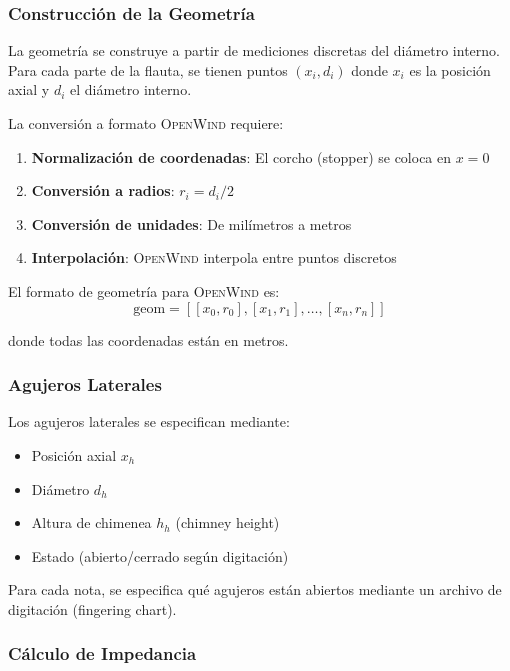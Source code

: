 \documentclass[12pt,a4paper,twocolumn]{article}
\newcommand{\openwind}{\textsc{OpenWind}}
\begin{document}
\subsubsection{Construcción de la Geometría}

La geometría se construye a partir de mediciones discretas del diámetro interno. Para cada parte de la flauta, se tienen puntos $(x_i, d_i)$ donde $x_i$ es la posición axial y $d_i$ el diámetro interno.

La conversión a formato \openwind{} requiere:
\begin{enumerate}
    \item \textbf{Normalización de coordenadas}: El corcho (stopper) se coloca en $x=0$
    \item \textbf{Conversión a radios}: $r_i = d_i/2$
    \item \textbf{Conversión de unidades}: De milímetros a metros
    \item \textbf{Interpolación}: \openwind{} interpola entre puntos discretos
\end{enumerate}

El formato de geometría para \openwind{} es:
\begin{equation}
\text{geom} = [[x_0, r_0], [x_1, r_1], \ldots, [x_n, r_n]]
\end{equation}

donde todas las coordenadas están en metros.

\subsubsection{Agujeros Laterales}

Los agujeros laterales se especifican mediante:
\begin{itemize}
    \item Posición axial $x_h$
    \item Diámetro $d_h$
    \item Altura de chimenea $h_h$ (chimney height)
    \item Estado (abierto/cerrado según digitación)
\end{itemize}

Para cada nota, se especifica qué agujeros están abiertos mediante un archivo de digitación (fingering chart).

\subsubsection{Cálculo de Impedancia}
\end{document}
